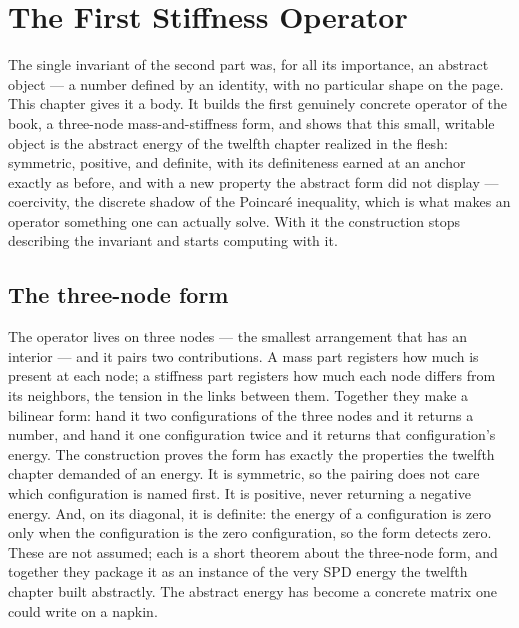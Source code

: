 \chapter{The First Stiffness Operator}
\label{chap:first-stiffness-operator}

The single invariant of the second part was, for all its importance, an abstract object --- a number
defined by an identity, with no particular shape on the page. This chapter gives it a body. It builds
the first genuinely concrete operator of the book, a three-node mass-and-stiffness form, and shows that
this small, writable object is the abstract energy of the twelfth chapter realized in the flesh:
symmetric, positive, and definite, with its definiteness earned at an anchor exactly as before, and
with a new property the abstract form did not display --- coercivity, the discrete shadow of the
Poincar\'e inequality, which is what makes an operator something one can actually solve. With it the
construction stops describing the invariant and starts computing with it.

\section{The three-node form}
\label{se:the-three-node-form}

The operator lives on three nodes --- the smallest arrangement that has an interior --- and it pairs two
contributions. A mass part registers how much is present at each node; a stiffness part registers how
much each node differs from its neighbors, the tension in the links between them. Together they make a
bilinear form: hand it two configurations of the three nodes and it returns a number, and hand it one
configuration twice and it returns that configuration's energy. The construction proves the form has
exactly the properties the twelfth chapter demanded of an energy. It is symmetric, so the pairing does
not care which configuration is named first. It is positive, never returning a negative energy. And, on
its diagonal, it is definite: the energy of a configuration is zero only when the configuration is the
zero configuration, so the form detects zero. These are not assumed; each is a short theorem about the
three-node form, and together they package it as an instance of the very SPD energy the twelfth chapter
built abstractly. The abstract energy has become a concrete matrix one could write on a napkin.

